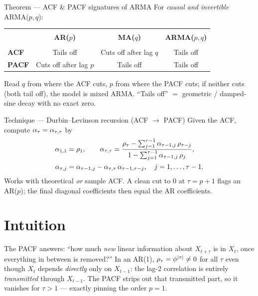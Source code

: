 \documentclass[11pt]{article}
\begin{document}
\begin{result}{Theorem --- ACF \& PACF signatures of ARMA}
For \emph{causal and invertible} ARMA($p,q$):
\begin{center}
\renewcommand{\arraystretch}{1.2}
\begin{tabular}{lccc}
\hline\\[-2.4mm]
 & \textbf{AR($p$)} & \textbf{MA($q$)} & \textbf{ARMA($p,q$)}\\[0.5mm]
\hline\\[-2.4mm]
\textbf{ACF}  & Tails off            & Cuts off after lag $q$ & Tails off\\
\textbf{PACF} & Cuts off after lag $p$ & Tails off             & Tails off\\[0.5mm]
\hline
\end{tabular}
\end{center}
Read $q$ from where the ACF cuts, $p$ from where the PACF cuts; if neither cuts (both tail off), the model is mixed ARMA. ``Tails off'' $=$ geometric / damped-sine decay with no exact zero.
\end{result}

\begin{result}{Technique --- Durbin--Levinson recursion (ACF $\to$ PACF)}
Given the ACF, compute $\alpha_\tau=\alpha_{\tau,\tau}$ by
\[
\begin{aligned}
\alpha_{1,1}&=\rho_1,\qquad
\alpha_{\tau,\tau}
=\frac{\rho_\tau-\sum_{j=1}^{\tau-1}\alpha_{\tau-1,j}\,\rho_{\tau-j}}
       {1-\sum_{j=1}^{\tau-1}\alpha_{\tau-1,j}\,\rho_{j}},\\
\alpha_{\tau,j}&=\alpha_{\tau-1,j}-\alpha_{\tau,\tau}\,\alpha_{\tau-1,\tau-j},\quad j=1,\dots,\tau-1 .
\end{aligned}
\]
Works with theoretical \emph{or} sample ACF. A clean cut to $0$ at $\tau=p+1$ flags an AR($p$); the final diagonal coefficients then equal the AR coefficients.
\end{result}

\section*{Intuition}

\begin{intu}
The PACF answers: ``how much \emph{new} linear information about $X_{t+\tau}$ is in $X_t$, once everything in between is removed?'' In an AR(1), $\rho_\tau=\phi^{\left\lvert \tau \right\rvert}\ne0$ for all $\tau$ even though $X_t$ depends \emph{directly} only on $X_{t-1}$: the lag-2 correlation is entirely \emph{transmitted} through $X_{t-1}$. The PACF strips out that transmitted part, so it vanishes for $\tau>1$ --- exactly pinning the order $p=1$.
\end{intu}
\end{document}
